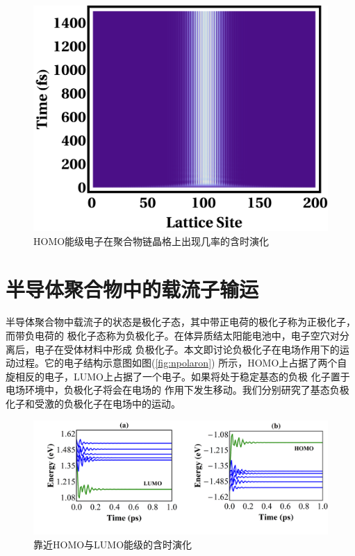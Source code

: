\documentclass[12pt,]{report}
\begin{document}
\begin{figure}[h!] 
    \centering
    \includegraphics[scale=1]{./figures/Exciton_Figure_10.png}
    \caption{HOMO能级电子在聚合物链晶格上出现几率的含时演化}
    \label{fig:t_wavefun}
\end{figure}

\clearpage

\pagestyle{fancy}

\chapter{半导体聚合物中的载流子输运}\label{ux534aux5bfcux4f53ux805aux5408ux7269ux4e2dux7684ux8f7dux6d41ux5b50ux8f93ux8fd0}

\lhead{}  \rhead{}

半导体聚合物中载流子的状态是极化子态，其中带正电荷的极化子称为正极化子，而带负电荷的
极化子态称为负极化子。在体异质结太阳能电池中，电子空穴对分离后，电子在受体材料中形成
负极化子。本文即讨论负极化子在电场作用下的运动过程。它的电子结构示意图如图(\ref{fig:npolaron})
所示，HOMO上占据了两个自旋相反的电子，LUMO上占据了一个电子。如果将处于稳定基态的负极
化子置于电场环境中，负极化子将会在电场的
作用下发生移动。我们分别研究了基态负极化子和受激的负极化子在电场中的运动。

\begin{figure}[h!] 
    \centering
    \includegraphics[scale=0.5]{./figures/energy_change.png}
    \caption{靠近HOMO与LUMO能级的含时演化}
    \label{fig:energy_change}
\end{figure}
\end{document}
